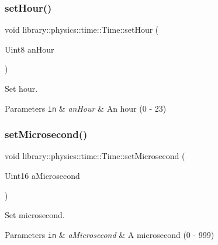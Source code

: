 \subsubsection{\texorpdfstring{set\+Hour()}{setHour()}}
{\footnotesize\ttfamily void library\+::physics\+::time\+::\+Time\+::set\+Hour (\begin{DoxyParamCaption}\item[{Uint8}]{an\+Hour }\end{DoxyParamCaption})}



Set hour. 


\begin{DoxyParams}[1]{Parameters}
\mbox{\tt in}  & {\em an\+Hour} & An hour (0 -\/ 23) \\
\hline
\end{DoxyParams}
\mbox{\label{classlibrary_1_1physics_1_1time_1_1_time_a1cc4c14fc9e88909bca57724da4f5c46}} 
\subsubsection{\texorpdfstring{set\+Microsecond()}{setMicrosecond()}}
{\footnotesize\ttfamily void library\+::physics\+::time\+::\+Time\+::set\+Microsecond (\begin{DoxyParamCaption}\item[{Uint16}]{a\+Microsecond }\end{DoxyParamCaption})}



Set microsecond. 


\begin{DoxyParams}[1]{Parameters}
\mbox{\tt in}  & {\em a\+Microsecond} & A microsecond (0 -\/ 999) \\
\hline
\end{DoxyParams}
\mbox{\label{classlibrary_1_1physics_1_1time_1_1_time_a1813a36c2f988b97db039843201abc68}} 
